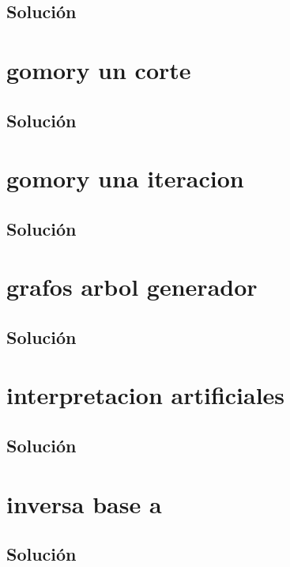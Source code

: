 \documentclass[a4paper,10pt,onecolumn]{report}
\begin{document}
\subsection*{Solución}

\clearpage
\section{gomory un corte}

\subsection*{Solución}

\clearpage
\section{gomory una iteracion}

\subsection*{Solución}

\clearpage
\section{grafos arbol generador}

\subsection*{Solución}

\clearpage
\section{interpretacion artificiales}

\subsection*{Solución}

\clearpage
\section{inversa base a}

\subsection*{Solución}

\clearpage
\end{document}

